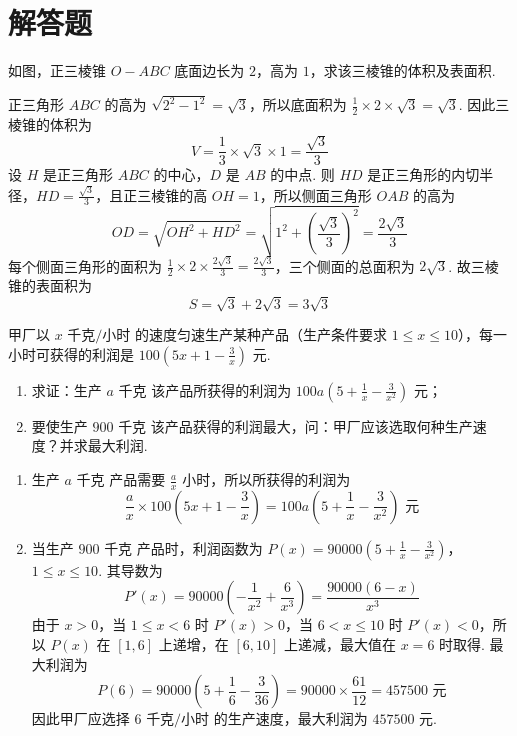 \section{解答题}

\begin{problem}
如图，正三棱锥 \(O - ABC\) 底面边长为 \(2\)，高为 \(1\)，求该三棱锥的体积及表面积.


\begin{solution}
正三角形 \(ABC\) 的高为 \(\sqrt{2^2-1^2}=\sqrt{3}\)，所以底面积为 \(\frac{1}{2}\times2\times\sqrt{3}=\sqrt{3}\). 因此三棱锥的体积为
\[
V=\frac{1}{3}\times\sqrt{3}\times1=\frac{\sqrt{3}}{3}
\]
设 \(H\) 是正三角形 \(ABC\) 的中心，\(D\) 是 \(AB\) 的中点. 则 \(HD\) 是正三角形的内切半径，\(HD=\frac{\sqrt{3}}{3}\)，且正三棱锥的高 \(OH=1\)，所以侧面三角形 \(OAB\) 的高为
\[
OD=\sqrt{OH^2+HD^2}=\sqrt{1^2+\left(\frac{\sqrt{3}}{3}\right)^2}=\frac{2\sqrt{3}}{3}
\]
每个侧面三角形的面积为 \(\frac{1}{2}\times2\times\frac{2\sqrt{3}}{3}=\frac{2\sqrt{3}}{3}\)，三个侧面的总面积为 \(2\sqrt{3}\). 故三棱锥的表面积为
\[
S=\sqrt{3}+2\sqrt{3}=3\sqrt{3}
\]
\end{solution}
\end{problem}

\begin{problem}
甲厂以 \(x\text{ 千克/小时}\) 的速度匀速生产某种产品（生产条件要求 \(1 \leqslant x \leqslant 10\)），每一小时可获得的利润是 \(100\left(5x + 1 - \frac{3}{x}\right)\text{ 元}\).

\begin{enumerate}
\item 求证：生产 \(a\text{ 千克}\) 该产品所获得的利润为 \(100a\left(5 + \frac{1}{x} - \frac{3}{x^2}\right)\text{ 元}\)；
\item 要使生产 \(900\text{ 千克}\) 该产品获得的利润最大，问：甲厂应该选取何种生产速度？并求最大利润.
\end{enumerate}

\begin{solution}
\begin{enumerate}
\item 生产 \(a\text{ 千克}\) 产品需要 \(\frac{a}{x}\) 小时，所以所获得的利润为
\[
\frac{a}{x}\times100\left(5x+1-\frac{3}{x}\right)=100a\left(5+\frac{1}{x}-\frac{3}{x^2}\right)\text{ 元}
\]
\item 当生产 \(900\text{ 千克}\) 产品时，利润函数为
\(P(x)=90000\left(5+\frac{1}{x}-\frac{3}{x^2}\right)\)，\(1\leqslant x\leqslant10\).
其导数为
\[
P'(x)=90000\left(-\frac{1}{x^2}+\frac{6}{x^3}\right)=\frac{90000(6-x)}{x^3}
\]
由于 \(x>0\)，当 \(1\leqslant x<6\) 时 \(P'(x)>0\)，当 \(6<x\leqslant10\) 时 \(P'(x)<0\)，所以 \(P(x)\) 在 \([1,6]\) 上递增，在 \([6,10]\) 上递减，最大值在 \(x=6\) 时取得. 最大利润为
\[
P(6)=90000\left(5+\frac{1}{6}-\frac{3}{36}\right)=90000\times\frac{61}{12}=457500\text{ 元}
\]
因此甲厂应选择 \(6\text{ 千克/小时}\) 的生产速度，最大利润为 \(457500\text{ 元}\).
\end{enumerate}
\end{solution}
\end{problem}

